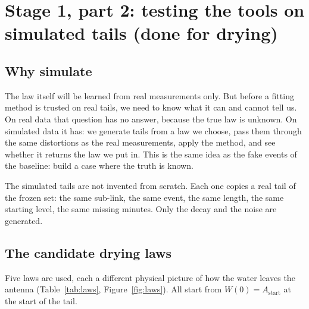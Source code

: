 \documentclass[11pt,a4paper]{article}
\newcommand{\Astart}{A_{\mathrm{start}}}
\begin{document}
\section{Stage 1, part 2: testing the tools on simulated tails (done for drying)}
\label{sec:tools}

\subsection{Why simulate}

The law itself will be learned from real measurements only. But before a fitting method is trusted on real tails, we
need to know what it can and cannot tell us. On real data that question has no answer, because the true law is
unknown. On simulated data it has: we generate tails from a law we choose, pass them through the same distortions as
the real measurements, apply the method, and see whether it returns the law we put in. This is the same idea as the
fake events of the baseline: build a case where the truth is known.

The simulated tails are not invented from scratch. Each one copies a real tail of the frozen set: the same sub-link,
the same event, the same length, the same starting level, the same missing minutes. Only the decay and the noise are
generated.

\subsection{The candidate drying laws}

Five laws are used, each a different physical picture of how the water leaves the antenna
(Table~\ref{tab:laws}, Figure~\ref{fig:laws}). All start from $W(0) = \Astart$ at the start of the tail.
\end{document}
